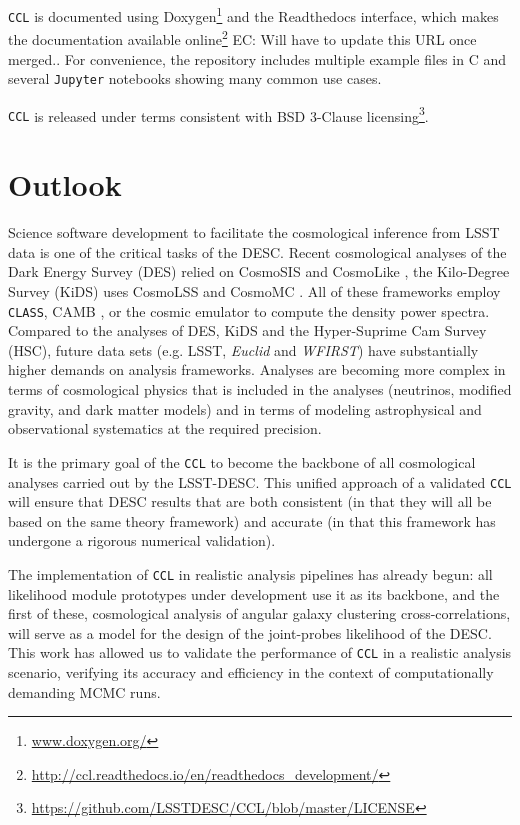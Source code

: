 \documentclass[\docopts]{\docclass}
\newcommand{\damonge}[1]{\textcolor{green!55!blue}{DA: #1}}
\newcommand{\elisa}[1]{\textcolor{green!10!orange!90!}{EC: #1}}
\newcommand{\ccl}{{\tt CCL}\xspace}
\begin{document}
\ccl is documented using Doxygen\footnote{\url{www.doxygen.org/}} and the Readthedocs interface, which makes the documentation available online\footnote{\url{http://ccl.readthedocs.io/en/readthedocs_development/}} \elisa{Will have to update this URL once merged.}. For convenience, the repository includes multiple example files in C and several {\tt Jupyter} notebooks showing many common use cases.

\ccl is released under terms consistent with BSD 3-Clause licensing\footnote{\url{https://github.com/LSSTDESC/CCL/blob/master/LICENSE}}.

\section{Outlook}
\label{sec:conclusion}

Science software development to facilitate the cosmological inference from LSST data is one of the critical tasks of the DESC. Recent cosmological analyses of the Dark Energy Survey (DES) relied on CosmoSIS \citep{Zuntz14} and CosmoLike \citep{krause17}, the Kilo-Degree Survey (KiDS) uses CosmoLSS \cite{Joudaki18} and CosmoMC \citep{Lewis02}. All of these frameworks employ {\tt CLASS}, CAMB \citep{Challinor2005}, or the cosmic emulator to compute the density power spectra. Compared to the analyses of DES, KiDS and the Hyper-Suprime Cam Survey (HSC), future data sets (e.g. LSST, {\it Euclid} and {\it WFIRST}) have substantially higher demands on analysis frameworks. Analyses are becoming more complex in terms of cosmological physics that is included in the analyses (neutrinos, modified gravity, and dark matter models) and in terms of modeling astrophysical and observational systematics at the required precision. 

It is the primary goal of the \ccl to become the backbone of all cosmological analyses carried out by the LSST-DESC. This unified approach of a validated \ccl will ensure that DESC results that are both consistent (in that they will all be based on the same theory framework) and accurate (in that this framework has undergone a rigorous numerical validation).

The implementation of \ccl in realistic analysis pipelines has already begun: all likelihood module prototypes under development use it as its backbone, and the first of these, cosmological analysis of angular galaxy clustering cross-correlations, will serve as a model for the design of the joint-probes likelihood of the DESC. This work has allowed us to validate the performance of \ccl in a realistic analysis scenario, verifying its accuracy and efficiency in the context of computationally demanding MCMC runs. %
\end{document}
